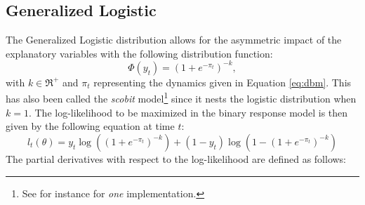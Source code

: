 \subsection{Generalized Logistic}
The Generalized Logistic distribution allows for the asymmetric impact of the explanatory variables with the following distribution
function:
\begin{equation}
\Phi \left( {{y_t}} \right) = {\left( {1 + {e^{ - {\pi_t}}}} \right)^{ - k}},
\end{equation}
with $k \in {\Re ^ + }$ and $\pi_t$ representing the dynamics given in Equation \ref{eq:dbm}. This has also been called the \emph{scobit}
model\footnote{See for instance \cite{Zeileis2011} for \emph{one} implementation.} since it nests the logistic distribution when
$k=1$.
The log-likelihood to be maximized in the binary response model is then given by the following equation at time $t$:
\begin{equation}
{l_t}\left( \theta  \right) = {y_t}\log \left( {{{\left( {1 + {e^{ - {\pi _t}}}} \right)}^{ - k}}} \right) + \left( {1 - {y_t}} \right)\log \left( {1 - {{\left( {1 + {e^{ - {\pi _t}}}} \right)}^{ - k}}} \right)
\end{equation}
The partial derivatives with respect to the log-likelihood are defined as follows:
